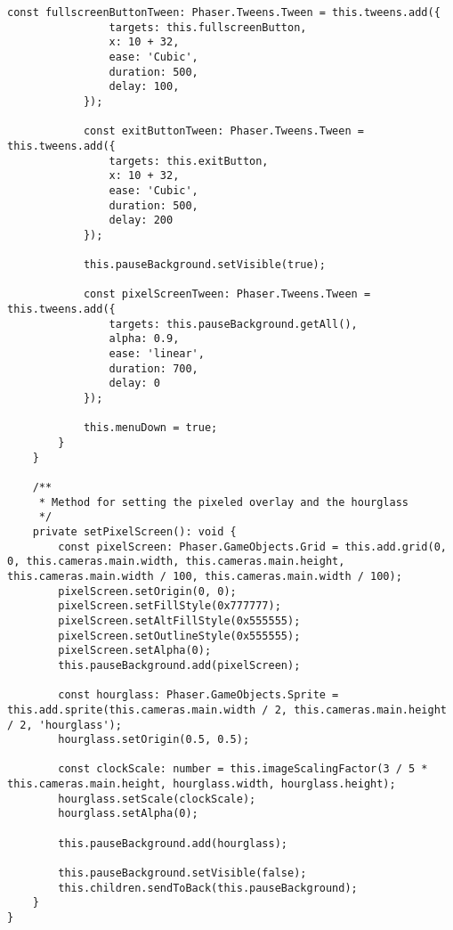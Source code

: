 \begin{lstlisting}[style=TypeScript, caption={dropDownMenu.ts}]
            const fullscreenButtonTween: Phaser.Tweens.Tween = this.tweens.add({
                targets: this.fullscreenButton,
                x: 10 + 32,
                ease: 'Cubic',
                duration: 500,
                delay: 100,
            });

            const exitButtonTween: Phaser.Tweens.Tween = this.tweens.add({
                targets: this.exitButton,
                x: 10 + 32,
                ease: 'Cubic',
                duration: 500,
                delay: 200
            });

            this.pauseBackground.setVisible(true);

            const pixelScreenTween: Phaser.Tweens.Tween = this.tweens.add({
                targets: this.pauseBackground.getAll(),
                alpha: 0.9,
                ease: 'linear',
                duration: 700,
                delay: 0
            });

            this.menuDown = true;
        }
    }

    /**
     * Method for setting the pixeled overlay and the hourglass
     */
    private setPixelScreen(): void {
        const pixelScreen: Phaser.GameObjects.Grid = this.add.grid(0, 0, this.cameras.main.width, this.cameras.main.height, this.cameras.main.width / 100, this.cameras.main.width / 100);
        pixelScreen.setOrigin(0, 0);
        pixelScreen.setFillStyle(0x777777);
        pixelScreen.setAltFillStyle(0x555555);
        pixelScreen.setOutlineStyle(0x555555);
        pixelScreen.setAlpha(0);
        this.pauseBackground.add(pixelScreen);

        const hourglass: Phaser.GameObjects.Sprite = this.add.sprite(this.cameras.main.width / 2, this.cameras.main.height / 2, 'hourglass');
        hourglass.setOrigin(0.5, 0.5);

        const clockScale: number = this.imageScalingFactor(3 / 5 * this.cameras.main.height, hourglass.width, hourglass.height);
        hourglass.setScale(clockScale);
        hourglass.setAlpha(0);

        this.pauseBackground.add(hourglass);

        this.pauseBackground.setVisible(false);
        this.children.sendToBack(this.pauseBackground);
    }
}
\end{lstlisting}

